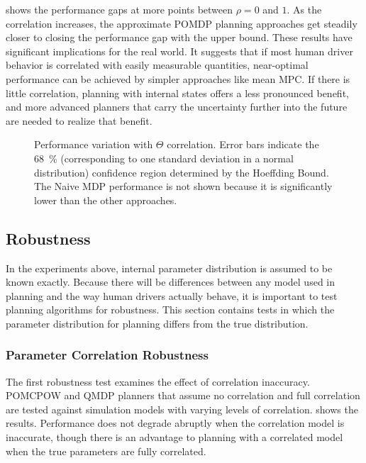  shows the performance gaps at more points between $\rho=0$ and $1$.
As the correlation increases, the approximate POMDP planning approaches get steadily closer to closing the performance gap with the upper bound.
These results have significant implications for the real world.
It suggests that if most human driver behavior is correlated with easily measurable quantities, near-optimal performance can be achieved by simpler approaches like mean MPC.
If there is little correlation, planning with internal states offers a less pronounced benefit, and more advanced planners that carry the uncertainty further into the future are needed to realize that benefit.

\begin{figure}[htbp]
    \centering
    
    \caption[Performance variation with $\Theta$ correlation]{Performance variation with $\Theta$ correlation. Error bars indicate the \SI{68}{\percent} (corresponding to one standard deviation in a normal distribution) confidence region determined by the Hoeffding Bound. The Naive MDP performance is not shown because it is significantly lower than the other approaches.}
    \label{fig:corplot}
\end{figure}

\subsection{Robustness}

In the experiments above, internal parameter distribution is assumed to be known exactly.
Because there will be differences between any model used in planning and the way human drivers actually behave, it is important to test planning algorithms for robustness.
This section contains tests in which the parameter distribution for planning differs from the true distribution.

\subsubsection{Parameter Correlation Robustness}

The first robustness test examines the effect of correlation inaccuracy.
POMCPOW and QMDP planners that assume no correlation and full correlation are tested against simulation models with varying levels of correlation.
 shows the results.
Performance does not degrade abruptly when the correlation model is inaccurate, though there is an advantage to planning with a correlated model when the true parameters are fully correlated.

